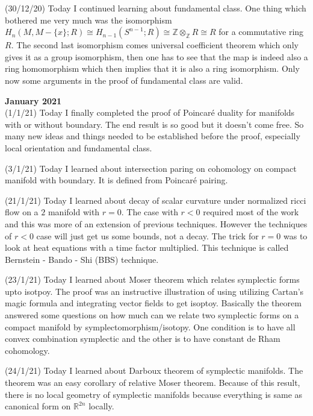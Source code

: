 \documentclass[12pt,a4paper]{article}
\begin{document}
 (30/12/20) Today I continued learning about fundamental class. One thing which bothered me very much was the isomorphism $H_n(M,M-\{x\};R)\cong H_{n-1}(S^{n-1};R) \cong \mathbb{Z} \otimes_{\mathbb{Z}}R \cong R$ for a commutative ring $R$. 
 The second last isomorphism comes universal coefficient theorem which only gives it as a group isomorphism, then one has to see that the map is indeed also a ring homomorphism which then implies that it is also a ring isomorphism. Only now some arguments in the proof of fundamental class are valid.\\
 
 
 \maketitle\textbf{January 2021}
 \\
 
 (1/1/21) Today I finally completed the proof of Poincaré duality for manifolds with or without boundary. The end result is so good but it doesn't come free. So many new ideas and things needed to be established before the proof, especially local orientation and fundamental class.
 
 (3/1/21) Today I learned about intersection paring on cohomology on compact manifold with boundary. It is defined from Poincaré pairing. 
 
 (21/1/21) Today I learned about decay of scalar curvature under normalized ricci flow on a $2$ manifold with $r=0$. The case with $r<0$ required most of the work and this was more of an extension of previous techniques. However the techniques of $r<0$ case will just get us some bounds, not a decay. The trick for $r=0$ was to look at heat equations with a time factor multiplied. This technique is called Bernstein - Bando - Shi (BBS) technique. 
 
 (23/1/21) Today I learned about Moser theorem which relates symplectic forms upto isotpoy. The proof was an instructive illustration of using utilizing Cartan's magic formula and integrating vector fields to get isoptoy. Basically the theorem answered some questions on how much can we relate two symplectic forms on a compact manifold by symplectomorphism/isotopy. One condition is to have all convex combination symplectic and the other is to have constant de Rham cohomology.
 
 (24/1/21) Today I learned about Darboux theorem of symplectic manifolds. The theorem was an easy corollary of relative Moser theorem. Because of this result, there is no local geometry of symplectic manifolds because everything is same as canonical form on $\mathbb{R}^{2n}$ locally. 
 
\end{document}
